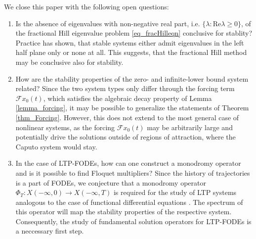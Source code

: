 \documentclass{svproc}
\begin{document}
{		We close this paper with the following open questions: 
			\begin{enumerate}
				\item Is the absence of eigenvalues with non-negative real part, i.e. $\{\lambda: \mathrm{Re}\lambda \geq 0\}$, of the fractional Hill eigenvalue problem \eqref{eq_fracHilleqn} conclusive for stablity? Practice has shown, that stable systems either admit eigenvalues in the left half plane only or none at all. This suggests, that the fractional Hill method may be conclusive also for stability.
				\item How are the stability properties of the zero- and infinite-lower bound system related? Since the two system types only differ through the forcing term $\mathcal F x_0(t)$, which satisfies the algebraic decay property of Lemma \ref{lemma_forcing}, it may be possible to generalize the statements of Theorem \ref{thm_Forcing}. However, this does not extend to the most general case of nonlinear systems, as the forcing $\mathcal F x_0(t)$ may be arbitrarily large and potentially drive the solutions outside of regions of attraction, where the Caputo system would stay. 
				\item In the case of LTP-FODEs, how can one construct a monodromy operator and is it possible to find Floquet multipliers? Since the history of trajectories is a part of FODEs, we conjecture that a monodromy operator $\Phi_T:X(-\infty,0)\to X(-\infty,T)$ is required for the study of LTP systems analogous to the case of functional differential equations \cite{Hale1977}. The spectrum of this operator will map the stability properties of the respective system. Consequently, the study of fundamental solution operators for LTP-FODEs is a neccessary first step.
			\end{enumerate}}{ }
\end{document}
